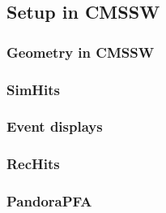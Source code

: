 \subsection{Setup in CMSSW}
\label{sec:cmssw}

\subsubsection{Geometry in CMSSW}

\subsubsection{SimHits}

\subsubsection{Event displays}

\subsubsection{RecHits}

\subsubsection{PandoraPFA}
